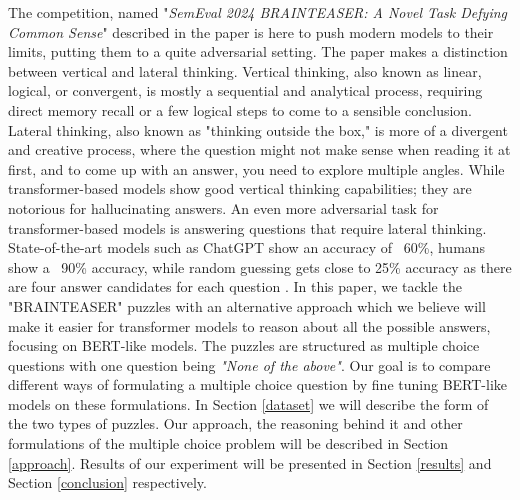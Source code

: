 The competition, named "\textit{SemEval 2024 BRAINTEASER: A Novel Task Defying Common Sense}" described in the paper \citep{semeval} is here to push modern models to their limits, putting
them to a quite adversarial setting.
The paper makes a distinction between vertical and lateral thinking.
Vertical thinking, also known as linear, logical, or convergent, is mostly a sequential and analytical process, requiring direct memory recall or a few logical steps to come to a sensible conclusion.
Lateral thinking, also known as "thinking outside the box," is more of a divergent and creative process, where the question might not make sense when reading it at first, and to come up with an answer, you need to explore multiple angles.
While transformer-based models show good vertical thinking capabilities; they are notorious for hallucinating answers.
An even more adversarial task for transformer-based models is answering questions that require lateral thinking. State-of-the-art models such as ChatGPT show an accuracy of ~60\%, humans show a ~90\% accuracy, while random guessing gets close to 25\% accuracy as there are four answer candidates for each question \citep{semeval}.
In this paper, we tackle the "BRAINTEASER" puzzles with an alternative approach which we believe will make it easier for transformer models to reason about all the possible answers, focusing on BERT-like models.
The puzzles are structured as multiple choice questions with one question being \emph{"None of the above"}.
Our goal is to compare different ways of formulating a multiple choice question by fine tuning BERT-like models on these formulations.
In Section \ref{dataset} we will describe the form of the two types of puzzles. 
Our approach, the reasoning behind it and other formulations of the multiple choice problem will be described in Section \ref{approach}.
Results of our experiment will be presented in Section \ref{results} and Section \ref{conclusion} respectively.